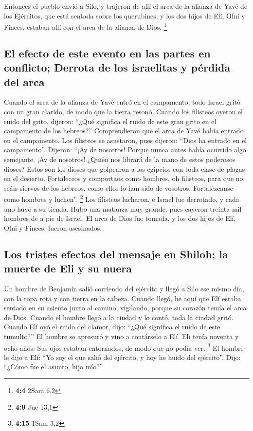  Entonces el pueblo envió a Silo, y trajeron de allí el
arca de la alianza de Yavé de los Ejércitos, que está sentada sobre los
querubines; y los dos hijos de Elí, Ofni y Finees, estaban allí con el
arca de la alianza de Dios. \footnote{\textbf{4:4} 2Sam 6,2}

\hypertarget{el-efecto-de-este-evento-en-las-partes-en-conflicto-derrota-de-los-israelitas-y-puxe9rdida-del-arca}{%
\subsection{El efecto de este evento en las partes en conflicto; Derrota
de los israelitas y pérdida del
arca}\label{el-efecto-de-este-evento-en-las-partes-en-conflicto-derrota-de-los-israelitas-y-puxe9rdida-del-arca}}

 Cuando el arca de la alianza de Yavé entró en el
campamento, todo Israel gritó con un gran alarido, de modo que la tierra
resonó.  Cuando los filisteos oyeron el ruido del grito,
dijeron: ``¿Qué significa el ruido de este gran grito en el campamento
de los hebreos?'' Comprendieron que el arca de Yavé había entrado en el
campamento.  Los filisteos se asustaron, pues dijeron:
``Dios ha entrado en el campamento''. Dijeron: ``¡Ay de nosotros! Porque
nunca antes había ocurrido algo semejante.  ¡Ay de
nosotros! ¿Quién nos librará de la mano de estos poderosos dioses? Estos
son los dioses que golpearon a los egipcios con toda clase de plagas en
el desierto.  Fortaleceos y comportaos como hombres, oh
filisteos, para que no seáis siervos de los hebreos, como ellos lo han
sido de vosotros. Fortalézcanse como hombres y luchen''. \footnote{\textbf{4:9}
  Jue 13,1}  Los filisteos lucharon, e Israel fue
derrotado, y cada uno huyó a su tienda. Hubo una matanza muy grande,
pues cayeron treinta mil hombres de a pie de Israel.  El
arca de Dios fue tomada, y los dos hijos de Elí, Ofni y Finees, fueron
asesinados.

\hypertarget{los-tristes-efectos-del-mensaje-en-shiloh-la-muerte-de-eli-y-su-nuera}{%
\subsection{Los tristes efectos del mensaje en Shiloh; la muerte de Eli
y su
nuera}\label{los-tristes-efectos-del-mensaje-en-shiloh-la-muerte-de-eli-y-su-nuera}}

 Un hombre de Benjamín salió corriendo del ejército y
llegó a Silo ese mismo día, con la ropa rota y con tierra en la cabeza.
 Cuando llegó, he aquí que Elí estaba sentado en su
asiento junto al camino, vigilando, porque su corazón temía el arca de
Dios. Cuando el hombre llegó a la ciudad y lo contó, toda la ciudad
gritó.  Cuando Elí oyó el ruido del clamor, dijo: ``¿Qué
significa el ruido de este tumulto?'' El hombre se apresuró y vino a
contárselo a Elí.  Elí tenía noventa y ocho años. Sus
ojos estaban entornados, de modo que no podía ver. \footnote{\textbf{4:15}
  1Sam 3,2}  El hombre le dijo a Elí: ``Yo soy el que
salió del ejército, y hoy he huido del ejército''. Dijo: ``¿Cómo fue el
asunto, hijo mío?''


